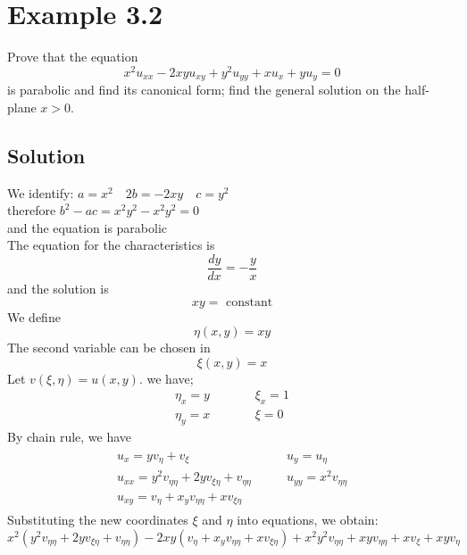 \documentclass[11pt]{report}
\newcommand{\sps}{\\[0.2cm]}
\begin{document}
	
	\section*{Example 3.2}
	Prove that the equation
	\begin{equation*}
		x^2u_{xx} - 2xyu_{xy} + y^2u_{yy} + xu_{x} + yu_y=0 \label{ex:3_2_1}
	\end{equation*}
	is parabolic and find its canonical form; find the general solution on the half-plane $x>0$.\\
	\subsection*{Solution}
	We identify: $a=x^2\quad 2b=-2xy\quad c=y^2$\\
	therefore $b^2-ac=x^2y^2-x^2y^2=0$\\
	and the equation is parabolic\sps
	The equation for the characteristics is
	\begin{equation*}
		\frac{dy}{dx} = -\frac{y}{x} \label{ex:3_2_2} 
	\end{equation*}
	and the solution is
	\begin{equation*}
		xy = \text{ constant}
	\end{equation*}
	We define
	\begin{equation*}
		\eta(x,y)=xy \label{ex:3_2_3}
	\end{equation*}
	The second variable can be chosen in
	\begin{equation*}
		\xi(x,y)=x\label{ex:3_2_4}
	\end{equation*}
	Let $v(\xi,\eta) = u(x,y)$. we have;
	\begin{eqnarray*}
		\eta_x =y &\qquad&\xi_x = 1\\
		\eta_y = x &\qquad&\xi = 0
	\end{eqnarray*}
	By chain rule, we have
	\begin{eqnarray*}
		\begin{array}{ll}
			u_x = yv_\eta + v_\xi &\qquad u_y = u_\eta\\
			u_{xx} = y^2v_{\eta\eta} + 2yv_{\xi\eta}+v_{\eta\eta} &\qquad u_{yy} = x^2v_{\eta\eta}\\
			u_{xy}=v_\eta + x_yv_{\eta\eta} + xv_{\xi\eta}
		\end{array}
	\end{eqnarray*}
	Substituting the new coordinates $\xi$ and $\eta$ into equations, we obtain:
	\begin{equation*}
		x^2(y^2v_{\eta\eta} + 2yv_{\xi\eta}+v_{\eta\eta})-2xy(v_\eta + x_yv_{\eta\eta} + xv_{\xi\eta}) + x^2y^2v_{\eta\eta} + xyv_{\eta\eta} + xv_{\xi}+xyv_\eta\label{ex:3_2_5}
	\end{equation*}
\end{document}
